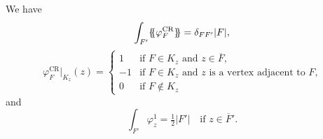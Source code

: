 \documentclass[review,onefignum,onetabnum,onealgnum]{siamart220329}
\begin{document}
We have
%
\begin{equation*}
  \int_{F'} \{\mskip-5mu\{ \varphi^{\mathrm{CR}}_F \}\mskip-5mu\} = \delta_{FF'} |F|,
\end{equation*}
%
\begin{equation*}
  \varphi^{\mathrm{CR}}_F|_{K_z}(z) = \begin{cases}
    1  & \text{if $F\in K_z$ and $z\in\overline{F}$,} \\
    -1 & \text{if $F\in K_z$ and $z$ is a~vertex adjacent to~$F$,} \\
    0  & \text{if $F\notin K_z$}
  \end{cases}
\end{equation*}
%
and
%
\begin{equation*}
  \int_{F'} \varphi^1_z = \tfrac12 |F'| \quad \text{if $z\in\overline F'$.}
\end{equation*}
%




\begingroup
\raggedbottom
{}


\endgroup
\end{document}
